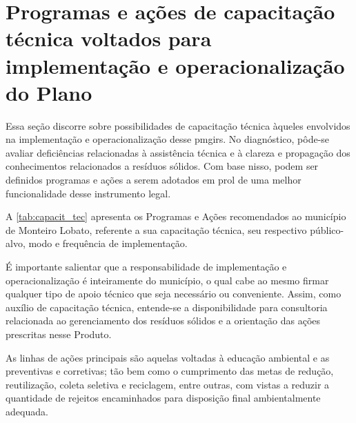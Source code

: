 
	
\FloatBarrier
\newpage
\section{Programas e ações de capacitação técnica voltados para implementação e operacionalização do Plano}
\label{sec:capac_tec}


Essa seção discorre sobre possibilidades de capacitação técnica àqueles envolvidos na implementação e operacionalização desse \gls{pmgirs}. No diagnóstico, pôde-se avaliar deficiências relacionadas à assistência técnica e à clareza e propagação dos conhecimentos relacionados a resíduos sólidos. Com base nisso, podem ser definidos programas e ações a serem adotados em prol de uma melhor funcionalidade desse instrumento legal.

A \autoref{tab:capacit_tec} apresenta os Programas e Ações recomendados ao município de Monteiro Lobato, referente a sua capacitação técnica, seu respectivo público-alvo, modo e frequência de implementação.

	
	
É importante salientar que a responsabilidade de implementação e operacionalização é inteiramente do município, o qual cabe ao mesmo firmar qualquer tipo de apoio técnico que seja necessário ou conveniente. Assim, como auxílio de capacitação técnica, entende-se a disponibilidade para consultoria relacionada ao gerenciamento dos resíduos sólidos e a orientação das ações prescritas nesse Produto.

As linhas de ações principais são aquelas voltadas à educação ambiental e as preventivas e corretivas; tão bem como o cumprimento das metas de redução, reutilização, coleta seletiva e reciclagem, entre outras, com vistas a reduzir a quantidade de rejeitos encaminhados para disposição final ambientalmente adequada.

